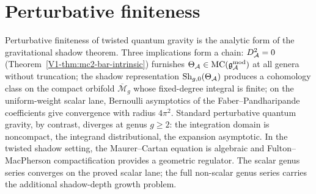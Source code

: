 %

\section{Perturbative finiteness}
\label{sec:thqg-perturbative-finiteness}
\label{ch:thqg-perturbative-finiteness}%

\providecommand{\HS}{\operatorname{HS}}
\providecommand{\Tr}{\operatorname{Tr}}
\providecommand{\Det}{\operatorname{Det}}
\providecommand{\Fred}{\operatorname{Fred}}
\providecommand{\rank}{\operatorname{rank}}
\providecommand{\Sym}{\operatorname{Sym}}
\providecommand{\id}{\mathrm{id}}
\providecommand{\ad}{\operatorname{ad}}
\providecommand{\wt}{\operatorname{wt}}
\providecommand{\Aut}{\operatorname{Aut}}
\providecommand{\Res}{\operatorname{Res}}
\providecommand{\Defcyc}{\operatorname{Def}_{\mathrm{cyc}}}
\providecommand{\gAmod}{\mathfrak{g}_{\cA}^{\mathrm{mod}}}
\providecommand{\Gmod}{\mathcal{G}^{\mathrm{mod}}}

Perturbative finiteness of twisted quantum gravity is the analytic form of the gravitational shadow theorem. Three implications form a chain: $D_{\mathcal{A}}^2 = 0$ (Theorem~\ref*{V1-thm:mc2-bar-intrinsic}) furnishes $\Theta_\cA \in \mathrm{MC}(\gAmod)$ at all genera without truncation; the shadow representation $\operatorname{Sh}_{g,0}(\Theta_{\mathcal{A}})$ produces a cohomology class on the compact orbifold $\overline{\mathcal{M}}_g$ whose fixed-degree integral is finite; on the uniform-weight scalar lane, Bernoulli asymptotics of the Faber--Pandharipande coefficients give convergence with radius $4\pi^2$. Standard perturbative quantum gravity, by contrast, diverges at genus $g \geq 2$: the integration domain is noncompact, the integrand distributional, the expansion asymptotic. In the twisted shadow setting, the Maurer--Cartan equation is algebraic and Fulton--MacPherson compactification provides a geometric regulator. The scalar genus series converges on the proved scalar lane; the full non-scalar genus series carries the additional shadow-depth growth problem.

